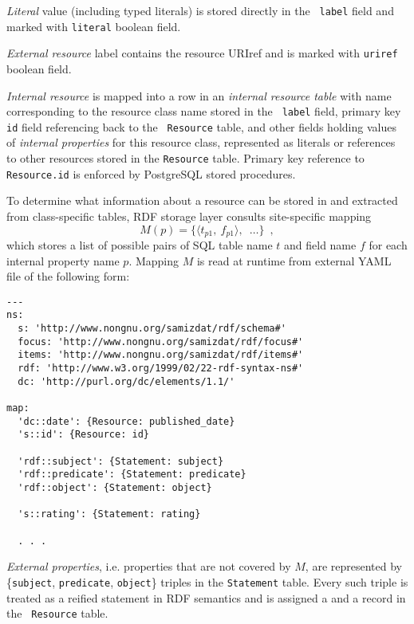 \documentclass{llncs}
\begin{document}
\emph{Literal} value (including typed literals) is stored directly in the {\tt
label} field and marked with {\tt literal} boolean field.

\emph{External resource} label contains the resource URIref and is marked with
{\tt uriref} boolean field.

\emph{Internal resource} is mapped into a row in an \emph{internal resource
table} with name corresponding to the resource class name stored in the {\tt
label} field, primary key {\tt id} field referencing back to the {\tt
Resource} table, and other fields holding values of \emph{internal properties}
for this resource class, represented as literals or references to other
resources stored in the {\tt Resource} table. Primary key reference to {\tt
Resource.id} is enforced by PostgreSQL stored procedures.

To determine what information about a resource can be stored in and extracted
from class-specific tables, RDF storage layer consults site-specific mapping
\begin{equation}
M(p) = \{\langle t_{p1},~f_{p1} \rangle, \enspace \dots\} \enspace ,
\end{equation}
which stores a list of possible pairs of SQL table name $t$ and field name $f$
for each internal property name $p$. Mapping $M$ is read at runtime from
external YAML\cite{yaml} file of the following form:

\begin{verbatim}
---
ns:
  s: 'http://www.nongnu.org/samizdat/rdf/schema#'
  focus: 'http://www.nongnu.org/samizdat/rdf/focus#'
  items: 'http://www.nongnu.org/samizdat/rdf/items#'
  rdf: 'http://www.w3.org/1999/02/22-rdf-syntax-ns#'
  dc: 'http://purl.org/dc/elements/1.1/'

map:
  'dc::date': {Resource: published_date}
  's::id': {Resource: id}

  'rdf::subject': {Statement: subject}
  'rdf::predicate': {Statement: predicate}
  'rdf::object': {Statement: object}

  's::rating': {Statement: rating}

  . . .
\end{verbatim}

\emph{External properties}, i.e. properties that are not covered by $M$, are
represented by \{{\tt subject}, {\tt predicate}, {\tt object}\} triples in the
{\tt Statement} table. Every such triple is treated as a reified statement in
RDF semantics and is assigned a {\tt <resource-id>} and a record in the {\tt
Resource} table.
\end{document}

